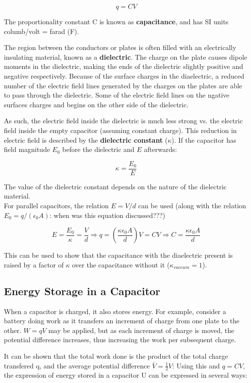 \documentclass[12pt, a4paper]{article}
\theoremstyle{definition}
\begin{document}
\[q = CV\]

The proportionality constant C is known as \textbf{capacitance}, and has SI units columb/volt = farad (F).

The region between the conductors or plates is often filled with an electrically insulating material, known as a \textbf{dielectric}.
The charge on the plate causes dipole moments in the dielectric, making the ends of the dielectric slightly positive and negative respectively.
Because of the surface charges in the diaelectric, a reduced number of the electric field lines generated by the charges on the plates are able to pass through the dielectric.
Some of the electric field lines on the ngative surfaces charges and begins on the other side of the dielectric.

As such, the electric field inside the dielectric is much less strong vs. the electric field inside the empty capacitor (assuming constant charge).
This reduction in electric field is described by the \textbf{dielectric constant} ($\kappa$).
If the capacitor has field magnitude $E_0$ before the dielectric and $E$ afterwards:

\[\kappa = \frac{E_0}{E}\]

The value of the dielectric constant depends on the nature of the dielectric material. \\

For parallel capacitors, the relation $E = V/d$ can be used (along with the relation $E_0 = q/(\epsilon_0 A)$: when was this equation discussed???)

\[E = \frac{E_0}{\kappa} = \frac{V}{d} \Rightarrow q = (\frac{\kappa \epsilon_0 A}{d})V = CV \Rightarrow C = \frac{\kappa \epsilon_0 A}{d}\]

This can be used to show that the capacitance with the diaelectric present is raised by a factor of $\kappa$ over the capacitance without it ($\kappa_{vaccum} = 1$).

\subsection{Energy Storage in a Capacitor}

When a capacitor is charged, it also stores energy.
For example, consider a battery doing work as it transfers an increment of charge from one plate to the other.
$W = qV$ may be applied, but as each increment of charge is moved, the potential difference increases, thus increasing the work per subsequent charge.

It can be shown that the total work done is the product of the total charge transfered q, and the average potential difference $\bar{V} = \frac{1}{2}V$:
Using this and $q = CV$, the expression of energy stored in a capacitor U can be expressed in several ways:
\end{document}
